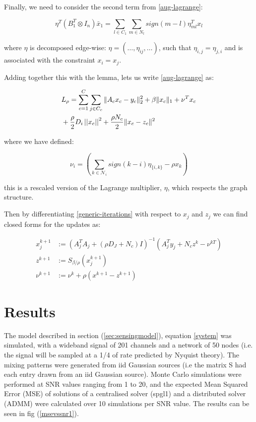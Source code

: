 \documentclass{article}
\begin{document}
Finally, we need to consider the second term from \eqref{aug-lagrange}:

\begin{equation}
\eta^T\left(B_1^T \otimes I_n\right)\bar{x}_1 = \sum_{l\in C_1} \sum_{m\in N_l}sign\left(m-l\right)\eta_{ml}^T x_l
\end{equation}

where \(\eta\) is decomposed edge-wise: \(\eta = \left(\ldots, \eta_{ij},\ldots\right)\), such that \(\eta_{i,j} = \eta_{j,i}\) and is associated with the constraint \(x_i = x_j\).

Adding together this with the lemma, lets us write \eqref{aug-lagrange} as:

\begin{align}
&L_\rho = \sum_{c=1}^C\sum_{j \in C_c} \|A_cx_c - y_c\|_2^2 + \beta\|x_c\|_1 + \nu^Tx_c \nonumber \\
&+ \frac{\rho}{2}D_i\left|\left|x_c\right|\right|^2 + \frac{\rho N_c}{2}\|x_c-z_c\|^2
\label{generic-iterations}
\end{align}

where we have defined:

\begin{equation}
\nu_i = \left(\sum_{k \in \mathcal{N}_i} sign\left(k-i\right)\eta_{\{i,k\}} - \rho x_k \right)
\end{equation}

this is a rescaled version of the Lagrange multiplier, \(\eta\), which respects the graph structure. 

Then by differentiating \eqref{generic-iterations} with respect to \(x_j\) and \(z_j\) we  can find closed forms for the updates as:

\begin{align}
x_j^{k+1} &:= \left(A_j^TA_j + (\rho D_J + N_c) I\right)^{-1}\left(A_j^Ty_j + N_c z^k - \nu^{kT}\right)\\
z^{k+1} &:= S_{\beta/\rho}\left(x_j^{k+1} \right)
 \\
\nu^{k+1} &:= \nu^{k} + \rho \left(x^{k+1}-z^{k+1}\right)
\label{dadmm_algo_lasso}
\end{align}

\section{Results} \label{sec:results}

The model described in section (\ref{sec:sensingmodel}), equation \eqref{system} was simulated, with a wideband signal of 201 channels and a network of 50 nodes (i.e. the signal will be sampled at a 1/4 of rate predicted by Nyquist theory). The mixing patterns were generated from iid Gaussian sources (i.e the matrix S had each entry drawn from an iid Gaussian source). Monte Carlo simulations were performed at SNR values ranging from 1 to 20, and the expected Mean Squared Error (MSE) of solutions of a centralised solver (spgl1) and a distributed solver (ADMM) were calculated over 10 simulations per SNR value. The results can be seen in fig (\ref{msevssnr1}). 
\end{document}
